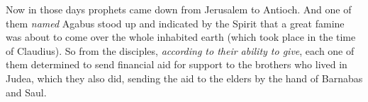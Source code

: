 \begin{biblechapter}
\verse Now in those days prophets came down from Jerusalem to Antioch.
\verse And one of them \textit{named} Agabus stood up and indicated by the Spirit that a great famine was about to come over the whole inhabited earth (which took place in the time of Claudius).
\verse So from the disciples, \textit{according to their ability to give}, each one of them determined to send financial aid for support to the brothers who lived in Judea,
\verse which they also did, sending the aid to the elders by the hand of Barnabas and Saul.
\end{biblechapter}

